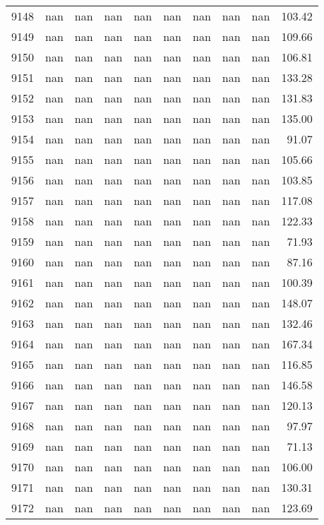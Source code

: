 \begin{tabular}{lrrrrrrrrr}
9148 & nan & nan & nan & nan & nan & nan & nan & nan & 103.42 \\
9149 & nan & nan & nan & nan & nan & nan & nan & nan & 109.66 \\
9150 & nan & nan & nan & nan & nan & nan & nan & nan & 106.81 \\
9151 & nan & nan & nan & nan & nan & nan & nan & nan & 133.28 \\
9152 & nan & nan & nan & nan & nan & nan & nan & nan & 131.83 \\
9153 & nan & nan & nan & nan & nan & nan & nan & nan & 135.00 \\
9154 & nan & nan & nan & nan & nan & nan & nan & nan & 91.07 \\
9155 & nan & nan & nan & nan & nan & nan & nan & nan & 105.66 \\
9156 & nan & nan & nan & nan & nan & nan & nan & nan & 103.85 \\
9157 & nan & nan & nan & nan & nan & nan & nan & nan & 117.08 \\
9158 & nan & nan & nan & nan & nan & nan & nan & nan & 122.33 \\
9159 & nan & nan & nan & nan & nan & nan & nan & nan & 71.93 \\
9160 & nan & nan & nan & nan & nan & nan & nan & nan & 87.16 \\
9161 & nan & nan & nan & nan & nan & nan & nan & nan & 100.39 \\
9162 & nan & nan & nan & nan & nan & nan & nan & nan & 148.07 \\
9163 & nan & nan & nan & nan & nan & nan & nan & nan & 132.46 \\
9164 & nan & nan & nan & nan & nan & nan & nan & nan & 167.34 \\
9165 & nan & nan & nan & nan & nan & nan & nan & nan & 116.85 \\
9166 & nan & nan & nan & nan & nan & nan & nan & nan & 146.58 \\
9167 & nan & nan & nan & nan & nan & nan & nan & nan & 120.13 \\
9168 & nan & nan & nan & nan & nan & nan & nan & nan & 97.97 \\
9169 & nan & nan & nan & nan & nan & nan & nan & nan & 71.13 \\
9170 & nan & nan & nan & nan & nan & nan & nan & nan & 106.00 \\
9171 & nan & nan & nan & nan & nan & nan & nan & nan & 130.31 \\
9172 & nan & nan & nan & nan & nan & nan & nan & nan & 123.69 \\

\end{tabular}
